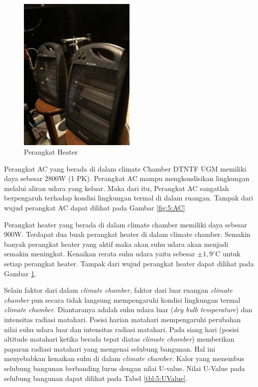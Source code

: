 \begin{figure}[!h]
	\centering
	\includegraphics[width=0.5\textwidth]{figures/Heater}
	\caption{Perangkat Heater}
	\label{fig:5:Heater}
\end{figure}

Perangkat AC yang berada di dalam climate Chamber DTNTF UGM memiliki daya sebesar 2800W (1 PK). Perangkat AC mampu mengkondisikan lingkungan melalui aliran udara yang keluar. Maka dari itu, Perangkat AC sangatlah berpengaruh terhadap kondisi lingkungan termal di dalam ruangan. Tampak dari wujud perangkat AC dapat dilihat pada Gambar \ref{fig:5:AC}

Perangkat heater yang berada di dalam climate chamber memiliki daya sebesar 900W. Terdapat dua buah perangkat heater di dalam climate chamber. Semakin banyak perangkat heater yang aktif maka akan suhu udara akan menjadi semakin meningkat. Kenaikan rerata suhu udara yaitu sebesar $\pm1,9^\circ$C untuk setiap perangkat heater. Tampak dari wujud perangkat heater dapat dilihat pada Gambar \ref{fig:5:Heater}.

Selain faktor dari dalam \textit{climate chamber}, faktor dari luar ruangan \textit{climate chamber} pun secara tidak langsung mempengaruhi kondisi lingkungan termal \textit{climate chamber}. Diantaranya adalah suhu udara luar (\textit{dry bulb temperature}) dan intensitas radiasi matahari. Posisi harian matahari mempengaruhi perubahan nilai suhu udara luar dan intensitas radiasi matahari. Pada siang hari (posisi altitude matahari ketika berada tepat diatas \textit{climate chamber}) memberikan paparan radiasi matahari yang mengenai selubung bangunan. Hal ini menyebabkan kenaikan suhu di dalam \textit{climate chamber}. Kalor yang menembus selubung bangunan berbanding lurus dengan nilai U-value. Nilai U-Value pada selubung bangunan dapat dilihat pada Tabel \ref{tbl:5:UValue}.\\

